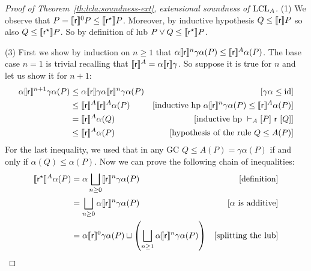 \begin{proof}[Proof of Theorem~\ref{th:lcla:soundness-ext}, extensional soundness of $\text{LCL}_A$]
	\noindent (1) We observe that $P = \llbracket\mathsf{r}\rrbracket^0 P \le \llbracket\mathsf{r}^{\star}\rrbracket P$. Moreover, by inductive hypothesis $Q \le \llbracket\mathsf{r}\rrbracket P$ so also $Q \le \llbracket\mathsf{r}^{\star}\rrbracket P$. So by definition of lub $P \lor Q \le \llbracket\mathsf{r}^{\star}\rrbracket P$.

	\noindent (3) First we show by induction on $n \ge 1$ that $\alpha \llbracket\mathsf{r}\rrbracket^n \gamma \alpha(P) \le \llbracket\mathsf{r}\rrbracket^{A} \alpha(P)$.
	The base case $n = 1$ is trivial recalling that $\llbracket\mathsf{r}\rrbracket^{A} = \alpha \llbracket\mathsf{r}\rrbracket \gamma$. So suppose it is true for $n$ and let us show it for $n + 1$:
	\begin{align*}
		\alpha \llbracket\mathsf{r}\rrbracket^{n+1} \gamma \alpha(P) & \le \alpha \llbracket\mathsf{r}\rrbracket \gamma \alpha \llbracket\mathsf{r}\rrbracket^n \gamma \alpha(P) & [\gamma \alpha \le \text{id}]                                                                        \\
		                                            & \le \llbracket\mathsf{r}\rrbracket^{A} \llbracket\mathsf{r}\rrbracket^{A} \alpha(P)                       & [\text{inductive hp } \alpha \llbracket\mathsf{r}\rrbracket^n \gamma \alpha(P) \le \llbracket\mathsf{r}\rrbracket^{A} \alpha(P)] \\
		                                            & = \llbracket\mathsf{r}\rrbracket^{A} \alpha(Q)                                           & [\text{inductive hp }\vdash_{A}\nobreak[P]~\mathsf{r}~[Q]]                                                     \\
		                                            & \le \llbracket\mathsf{r}\rrbracket^{A} \alpha(P)                                         & [\text{hypothesis of the rule }Q \le A(P)]
	\end{align*}
	For the last inequality, we used that in any GC $Q \le A(P) = \gamma \alpha(P)$ if and only if $\alpha(Q) \le \alpha(P)$.
	Now we can prove the following chain of inequalities:
	\begin{align*}
		\denot{\regr^{\kstar}}^{A} \alpha(P) & = \alpha \bigsqcup_{n \ge 0} \denot{\regr}^n \gamma \alpha(P)                                                               & [\text{definition}]                                               \\
		                                     & = \bigsqcup_{n \ge 0} \alpha \denot{\regr}^n \gamma \alpha(P)                                                               & [\alpha \text{ is additive}]                                      \\
		                                     & = \alpha \denot{\regr}^0 \gamma \alpha(P) \sqcup \left( \bigsqcup_{n \ge 1} \alpha \denot{\regr}^n \gamma \alpha(P) \right) & [\text{splitting the lub}]                                        \\

\end{align*}
\end{proof}
